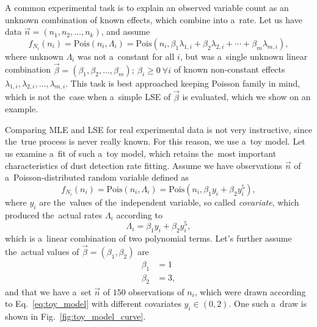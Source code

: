 A common experimental task is to explain an observed variable count as an unknown combination of known effects, which combine into a~rate. Let us have data $\vec{n} = (n_1, n_2, \dots , n_k)$, and assume
\begin{equation}
    f_{N_i}(n_i) = \mathrm{Pois}(n_i,\Lambda_i) = \mathrm{Pois}(n_i,\beta_1 \lambda_{1,i} + \beta_2 \lambda_{2,i} + \cdots + \beta_m \lambda_{m,i}), \label{eq:linear_comination_model}
\end{equation}
where unknown $\Lambda_i$ was not a~constant for all $i$, but was a~single unknown linear combination $\vec{\beta} = (\beta_1, \beta_2, \dots, \beta_m); \ \beta_i \geq 0 \ \forall i$ of known non-constant effects $\lambda_{1,i}, \lambda_{2,i}, \dots, \lambda_{m,i}$. This task is best approached keeping Poisson family in mind, which is not the~case when a~simple LSE of $\vec{\beta}$ is evaluated, which we show on an example. 

Comparing MLE and LSE for real experimental data is not very instructive, since the~true process is never really known. For this reason, we use a~toy model. Let us examine a~fit of such a~toy model, which retains the~most important characteristics of dust detection rate fitting. Assume we have observations $\vec{n}$ of a~Poisson-distributed random variable defined as
\begin{equation}
    f_{N_i}(n_i) = \mathrm{Pois}(n_i,\Lambda_i) = \mathrm{Pois}(n_i,\beta_1 y_i + \beta_2 y_i^5), \label{eq:toy_model}
\end{equation}
where $y_i$ are the~values of the~independent variable, so called \textit{covariate}, which produced the~actual rates $\Lambda_i$ according to
\begin{equation}
    \Lambda_i = \beta_1 y_i + \beta_2 y_i^5, \label{eq:toy_model_rate}
\end{equation}
which is a~linear combination of two polynomial terms. Let's further assume the~actual values of $\vec{\beta} = (\beta_1,\beta_2)$ are
\begin{equation}\begin{split}
    \beta_1 &= 1 \\
    \beta_2 &= 3, \label{eq:toy_beta_values}
\end{split}\end{equation}
and that we have a~set $\vec{n}$ of $150$ observations of $n_i$, which were drawn according to Eq.~\ref{eq:toy_model} with different covariates $y_i\in(0,2)$. One such a~draw is shown in Fig.~\ref{fig:toy_model_curve}. 

